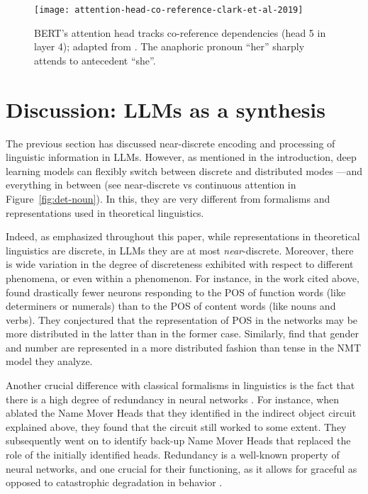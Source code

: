 \begin{figure}[tb]
  \centering
  \texttt{[image: attention-head-co-reference-clark-et-al-2019]}
  
  \caption{BERT's attention head tracks co-reference dependencies (head 5 in layer 4); adapted from \citet{clark-etal-2019-bert}. The anaphoric pronoun ``her'' sharply attends to antecedent ``she''.}
  \label{fig:coref}
\end{figure}

\section{Discussion: LLMs as a synthesis}
\label{sec:discussion}

The previous section has discussed near-discrete encoding and processing of linguistic information in LLMs. However, as mentioned in the introduction, deep learning models can flexibly switch between discrete and distributed modes ---and everything in between (see near-discrete vs continuous attention in Figure~\ref{fig:det-noun}).
In this, they are very different from formalisms and representations used in theoretical linguistics.

Indeed, as emphasized throughout this paper, while representations in theoretical linguistics are discrete, in LLMs they are at most \textit{near}-discrete.
Moreover, there is wide variation in the degree of discreteness exhibited with respect to different phenomena, or even within a phenomenon.
For instance, in the work cited above, \citet{durrani+2023} found drastically fewer neurons responding to the POS of function words (like determiners or numerals) than to the POS of content words (like nouns and verbs).
They conjectured that the representation of POS in the networks may be more distributed in the latter than in the former case.
Similarly, \citet{bau2019identifying} find that gender and number are represented in a more distributed fashion than tense in the NMT model they analyze.

Another crucial difference with classical formalisms in linguistics is the fact that there is a high degree of redundancy in neural networks \cite{durrani+2023}.
For instance, when \citet{wang2023interpretability} ablated the Name Mover Heads that they identified in the indirect object circuit explained above, they found that the circuit still worked to some extent. They subsequently went on to identify back-up Name Mover Heads that replaced the role of the initially identified heads.
Redundancy is a well-known property of neural networks, and one crucial for their functioning, as it allows for graceful as opposed to catastrophic degradation in behavior \cite{lecun+89}.

